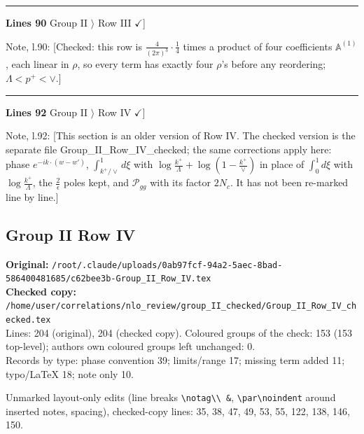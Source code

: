 \documentclass[10pt]{article}
\newenvironment{notebox}{\def\FrameCommand{{\color{notebar}\vrule width 1.5pt}\hspace{6pt}}\MakeFramed{\advance\hsize-\width\FrameRestore}\small}{\endMakeFramed}
\def\mf#1{\mathbb{#1}}
\begin{document}
\noindent\rule{\linewidth}{0.3pt}\par\noindent\textbf{Lines 90} \quad \textsf{Group II $\rangle$ Row III { $\checkmark$]}}\par
\begin{notebox}\textsf{\small Note, l.90:} [Checked: this row is $\frac{4}{(2\pi)^3}\cdot\frac14$ times a product of four coefficients $\mf{A}^{(1)}$, each linear in $\rho$, so every term has exactly four $\rho$'s before any reordering; $\Lambda<p^+<\vee$.]\end{notebox}
\noindent\rule{\linewidth}{0.3pt}\par\noindent\textbf{Lines 92} \quad \textsf{Group II $\rangle$ Row IV { $\checkmark$]}}\par
\begin{notebox}\textsf{\small Note, l.92:} [This section is an older version of Row IV. The checked version is the separate file Group\_II\_Row\_IV\_checked; the same corrections apply here: phase $e^{-ik\cdot(w-w')}$, $\int_{k^+/\vee}^{1}d\xi$ with $\log\frac{k^+}{\Lambda}+\log(1-\frac{k^+}{\vee})$ in place of $\int_0^1 d\xi$ with $\log\frac{k^+}{\Lambda}$, the $\frac{2}{\epsilon}$ poles kept, and $\mathcal{P}_{gg}$ with its factor $2N_c$. It has not been re-marked line by line.]\end{notebox}
\bigskip
\subsection{Group II Row IV}\label{sec:file-group_II_row_IV}
\noindent\textbf{Original:} \texttt{/root/.claude/uploads/0ab97fcf-94a2-5aec-8bad-586400481685/c62bee3b-Group\_II\_Row\_IV.tex}\\\textbf{Checked copy:} \texttt{/home/user/correlations/nlo\_review/group\_II\_checked/Group\_II\_Row\_IV\_checked.tex}\\
Lines: 204 (original), 204 (checked copy). Coloured groups of the check: 153 (153 top-level); author\textquotesingle s own coloured groups left unchanged: 0.\\
Records by type: phase convention 39; limits/range 17; missing term added 11; typo/LaTeX 18; note only 10.
\par\noindent Unmarked layout-only edits (line breaks \texttt{\textbackslash notag\textbackslash\textbackslash\ \&}, \texttt{\textbackslash par\textbackslash noindent} around inserted notes, spacing), checked-copy lines: 35, 38, 47, 49, 53, 55, 122, 138, 146, 150.
\end{document}

